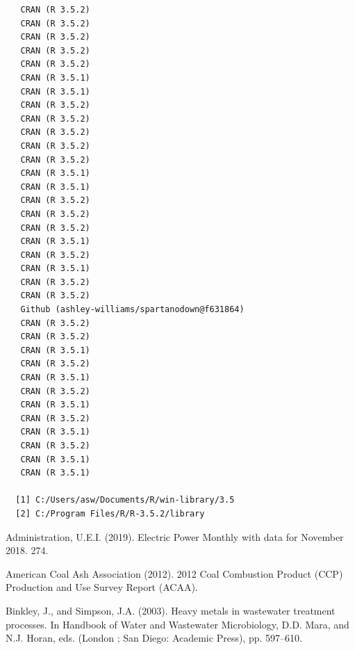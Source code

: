 \documentclass[ms]{uncgdissertationexp}
\theoremstyle{plain}
\theoremstyle{definition}
\theoremstyle{remark}
\begin{document}
\begin{verbatim}
   CRAN (R 3.5.2)                               
   CRAN (R 3.5.2)                               
   CRAN (R 3.5.2)                               
   CRAN (R 3.5.2)                               
   CRAN (R 3.5.2)                               
   CRAN (R 3.5.1)                               
   CRAN (R 3.5.1)                               
   CRAN (R 3.5.2)                               
   CRAN (R 3.5.2)                               
   CRAN (R 3.5.2)                               
   CRAN (R 3.5.2)                               
   CRAN (R 3.5.2)                               
   CRAN (R 3.5.1)                               
   CRAN (R 3.5.1)                               
   CRAN (R 3.5.2)                               
   CRAN (R 3.5.2)                               
   CRAN (R 3.5.2)                               
   CRAN (R 3.5.1)                               
   CRAN (R 3.5.2)                               
   CRAN (R 3.5.1)                               
   CRAN (R 3.5.2)                               
   CRAN (R 3.5.2)                               
   Github (ashley-williams/spartanodown@f631864)
   CRAN (R 3.5.2)                               
   CRAN (R 3.5.2)                               
   CRAN (R 3.5.1)                               
   CRAN (R 3.5.2)                               
   CRAN (R 3.5.1)                               
   CRAN (R 3.5.2)                               
   CRAN (R 3.5.1)                               
   CRAN (R 3.5.2)                               
   CRAN (R 3.5.1)                               
   CRAN (R 3.5.2)                               
   CRAN (R 3.5.1)                               
   CRAN (R 3.5.1)                               
  
  [1] C:/Users/asw/Documents/R/win-library/3.5
  [2] C:/Program Files/R/R-3.5.2/library
  \end{verbatim}
  \hypertarget{refs}{}
  \hypertarget{ref-usenergyinformationadministrationElectricPowerMonthly2019}{}
  Administration, U.E.I. (2019). Electric Power Monthly with data for
  November 2018. 274.
  
  \hypertarget{ref-americancoalashassociation2012CoalCombustion2012}{}
  American Coal Ash Association (2012). 2012 Coal Combustion Product (CCP)
  Production and Use Survey Report (ACAA).
  
  \hypertarget{ref-binkleyHeavyMetalsWastewater2003}{}
  Binkley, J., and Simpson, J.A. (2003). Heavy metals in wastewater
  treatment processes. In Handbook of Water and Wastewater Microbiology,
  D.D. Mara, and N.J. Horan, eds. (London ; San Diego: Academic Press),
  pp. 597--610.
  
\end{document}

